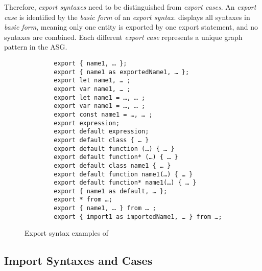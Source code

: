 Therefore, \emph{export syntaxes} need to be distinguished from \emph{export cases}. An \emph{export case} is identified by the \emph{basic form} of an \emph{export syntax}.  displays all syntaxes in \emph{basic form}, meaning only one entity is exported by one export statement, and no syntaxes are combined. Each different \emph{export case} represents a unique graph pattern in the ASG.

\begin{figure}[!htb]
	\centering
	\begin{minipage}{31em}
		\begin{verbatim}
		export { name1, … };
		export { name1 as exportedName1, … };
		export let name1, … ;
		export var name1, … ;
		export let name1 = …, … ;
		export var name1 = …, … ;
		export const name1 = …, … ;
		export expression;
		export default expression;
		export default class { … }
		export default function (…) { … }
		export default function* (…) { … }
		export default class name1 { … }
		export default function name1(…) { … }
		export default function* name1(…) { … }
		export { name1 as default, … };
		export * from …;
		export { name1, … } from … ;
		export { import1 as importedName1, … } from …;
		\end{verbatim}
	\end{minipage}
  \caption{Export syntax examples of }
  \label{fig:export-syntaxes}
\end{figure}





\subsection{Import Syntaxes and Cases}


